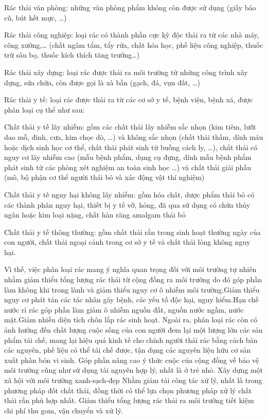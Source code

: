 Rác thải văn phòng: những văn phòng phẩm không còn được sử dụng (giấy báo cũ,  bút hết mực, …)

 Rác thải công nghiệp: loại rác có thành phần cực kỳ độc thải ra từ các nhà máy, công xưởng,… (chất ngâm tẩm, tẩy rửa, chất hóa học, phế liệu công nghiệp, thuốc trừ sâu bọ, thuốc kích thích tăng trưởng…) 

 Rác thải xây dựng: loại rác được thải ra môi trường từ những công trình xây dựng, sửa chữa, còn được gọi là xà bần (gạch, đá, vụn đất, …)

 Rác thải y tế: loại rác được thải ra từ các cơ sở y tế, bệnh viện, bệnh xá, được phân loại cụ thể như sau:

	 Chất thải y tế lây nhiễm: gồm các chất thải lây nhiễm sắc nhọn (kim tiêm, lưỡi dao mỗ, đinh, cưa, kim chọc dò, …) và không sắc nhọn (chất thải thấm, dính máu hoặc dịch sinh học cơ thể, chất thải phát sinh từ buồng cách ly, …), chất thải có nguy cơ lây nhiễm cao (mẫu bệnh phẩm, dụng cụ đựng, dính mẫu bệnh phẩm phát sinh từ các phòng xét nghiệm an toàn sinh học …) và chất thải giải phẫu (mô, bộ phận cơ thể người thái bỏ và xác động vật thí nghiệm)

	 Chất thải y tế nguy hại không lây nhiễm: gồm hóa chất, dược phẩm thải bỏ có các thành phân nguy hại, thiết bị y tế vỡ, hỏng, đã qua sử dụng có chứa thủy ngân hoặc kim loại nặng, chất hàn răng amalgam thải bỏ

	 Chất thải y tế thông thường: gồm chất thải rắn trong sinh hoạt thường ngày của con người, chất thải ngoại cảnh trong cơ sở y tế và chất thải lỏng không nguy hại.

Vì thế, việc phân loại rác mang ý nghĩa quan trọng đối với môi trường tự nhiên nhằm giảm thiểu tổng lượng rác thải từ cộng đồng ra môi trường do đó góp phần làm không khi trong lành và giảm thiểu nguy cơ ô nhiễm môi trường.Giảm thiểu nguy cơ phát tán các tác nhân gây bệnh, các yếu tố độc hại, nguy hiểm.Hạn chế nước rỉ rác góp phần làm giảm ô nhiễm nguồn đất, nguồn nước ngầm, nước mặt.Giảm nhiều diện tích chôn lắp rác sinh hoạt. Ngoài ra, phân loại rác còn có ảnh hưởng đến chất lượng cuộc sống của con người đem lại một lượng lớn các sản phẩm tái chế, mang lại hiệu quả kinh tế cho chính người thải rác bằng cách bán các nguyên, phế liệu có thể tái chế được, tận dụng các nguyên liệu hữu cơ sản xuất phân bón vi sinh.
Góp phần nâng cao ý thức cuộc của cộng đồng về bảo vệ môi trường cũng như sử dụng tài nguyên hợp lý, nhất là ở trẻ nhỏ.
Xây dựng một xã hội với môi trường xanh-sạch-đẹp
Nhằm giảm tải công tác xử lý, nhất là trong phương pháp đốt chất thải, đồng thời có thể lựa chọn phương pháp xử lý chất thải rắn phù hợp nhất.
Giảm thiểu tổng lượng rác thải ra môi trường tiết kiệm chi phí thu gom, vận chuyển và xử lý.

